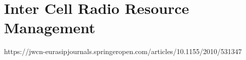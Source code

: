 \section{Inter Cell Radio Resource Management}
{
    https://jwcn-eurasipjournals.springeropen.com/articles/10.1155/2010/531347
}